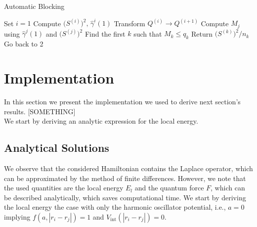 \documentclass[11pt,a4paper]{article}
\numberwithin{equation}{section}
\begin{document}
\begin{algorithm}
	\caption{Automatic Blocking}
	\label{Alg:AutomaticBlocking}
	\begin{algorithmic}[1]
		\State Set $i=1$
		\State Compute $\big(S^{(i)}\big)^2, \, \hat\gamma^i(1)$
		\State Transform $Q^{(i)}\to Q^{(i+1)}$
		\State Compute $M_j$ using $\hat{\gamma}^j(1)$ and $\big(S^{(j)}\big)^2$ 
		\State Find the first $k$ such that $M_k\leq q_k$
		\State Return $\big(S^{(k)}\big)^2/n_k$
		\Else
		\State Go back to  2
		\EndIf
		\EndProcedure
	\end{algorithmic}
\end{algorithm}






































\section{Implementation}
%
%
%
In this section we present the implementation we used to derive next section's results. 
%
[SOMETHING]\\
We start by deriving an analytic expression for the local energy. 
\subsection{Analytical Solutions}
%
%
We observe that the considered Hamiltonian contains the Laplace operator, which can be approximated by the method of finite differences.
%
However, we note that the used quantities are the local energy $E_l$ and the quantum force $F$, which can be described analytically, which saves computational time. 
%
We start by deriving the local energy the case with only the harmonic oscillator potential, i.e., $a=0$ implying $f(a,|r_i-r_j|)=1$ and $V_{\mathrm{int}}(|r_i-r_j|)=0$.
%
\end{document}
